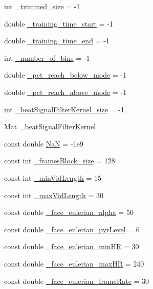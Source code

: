 \begin{DoxyCompactItemize}
int \hyperlink{namespace_m_h_r_a87eb7e22893e5160d4a98344bc8bdff4}{\+\_\+trimmed\+\_\+size} = -\/1
\item 
double \hyperlink{namespace_m_h_r_a32705f521f2a65e0b5c5454b328c26db}{\+\_\+training\+\_\+time\+\_\+start} = -\/1
\item 
double \hyperlink{namespace_m_h_r_a6ee9276234c51d213a3b1631eee5f315}{\+\_\+training\+\_\+time\+\_\+end} = -\/1
\item 
int \hyperlink{namespace_m_h_r_ab3a5de59c2eed470e94ca0e79abd2b5c}{\+\_\+number\+\_\+of\+\_\+bins} = -\/1
\item 
double \hyperlink{namespace_m_h_r_acb8b09915d13e40eba7f00718c40ce6a}{\+\_\+pct\+\_\+reach\+\_\+below\+\_\+mode} = -\/1
\item 
double \hyperlink{namespace_m_h_r_a3b2e38d795c8389fd066cefa0af2ef47}{\+\_\+pct\+\_\+reach\+\_\+above\+\_\+mode} = -\/1
\item 
int \hyperlink{namespace_m_h_r_a5d907d8ef896004dce9f0fd1d47b77e7}{\+\_\+beat\+Signal\+Filter\+Kernel\+\_\+size} = -\/1
\item 
Mat \hyperlink{namespace_m_h_r_ab83e011c36b7688dab5ef024c8894300}{\+\_\+beat\+Signal\+Filter\+Kernel}
\item 
const double \hyperlink{namespace_m_h_r_a1f2bac57e6ccaebc6afd932278b163ec}{Na\+N} = -\/1e9
\item 
const int \hyperlink{namespace_m_h_r_a167cff7309df5114f9e72af8b5e820c1}{\+\_\+frames\+Block\+\_\+size} = 128
\item 
const int \hyperlink{namespace_m_h_r_aced573ebf5ae641d5c3a58c9762462fb}{\+\_\+min\+Vid\+Length} = 15
\item 
const int \hyperlink{namespace_m_h_r_a0a7cdb59c1f1e8af6e6b61543c81724d}{\+\_\+max\+Vid\+Length} = 30
\item 
const double \hyperlink{namespace_m_h_r_a0f9c0b966020cdd7ef37cb2207d981ab}{\+\_\+face\+\_\+eulerian\+\_\+alpha} = 50
\item 
const double \hyperlink{namespace_m_h_r_a3eae7b41b03bf25902413f62c5e6545d}{\+\_\+face\+\_\+eulerian\+\_\+pyr\+Level} = 6
\item 
const double \hyperlink{namespace_m_h_r_a95e1651df07df85f364ac713aac7a53b}{\+\_\+face\+\_\+eulerian\+\_\+min\+H\+R} = 30
\item 
const double \hyperlink{namespace_m_h_r_a366f66e2cd387cf039dc5d7de4ff5f9d}{\+\_\+face\+\_\+eulerian\+\_\+max\+H\+R} = 240
\item 
const double \hyperlink{namespace_m_h_r_a3c21f6619922e618bff40700a5723015}{\+\_\+face\+\_\+eulerian\+\_\+frame\+Rate} = 30

\end{DoxyCompactItemize}
